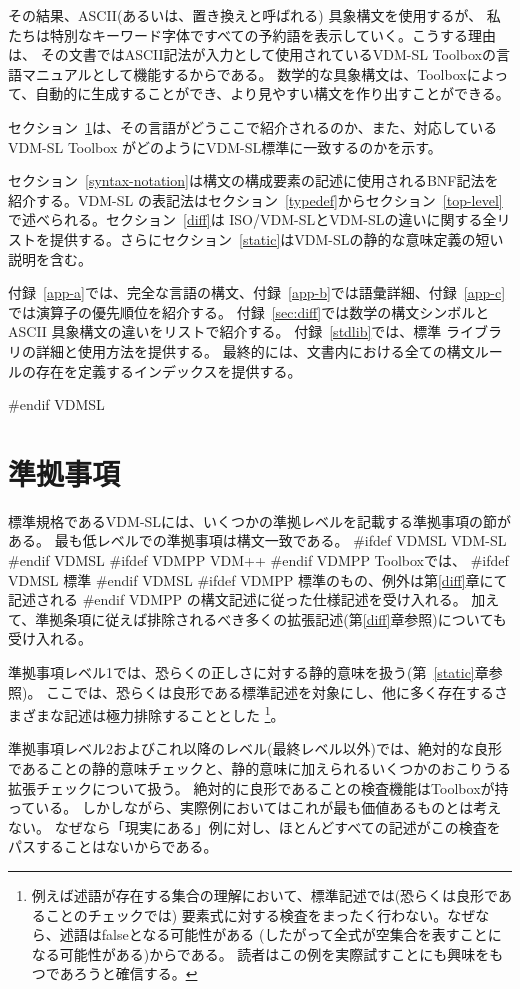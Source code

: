 \documentclass[\pformat,12pt]{jarticle}
\newcommand{\vdmslpp}[2]{%
#ifdef VDMSL
#1
#endif VDMSL
#ifdef VDMPP
#2
#endif VDMPP
}
\newcommand{\vdmsl}{VDM-SL}
\newcommand{\vdmpp}{VDM++}
\begin{document}
その結果、ASCII(あるいは、置き換えと呼ばれる) 具象構文を使用するが、
私たちは特別なキーワード字体ですべての予約語を表示していく。こうする理由は、
その文書ではASCII記法が入力として使用されているVDM-SL Toolboxの言語マニュアルとして機能するからである。
数学的な具象構文は、Toolboxによって、自動的に生成することができ、より見やすい構文を作り出すことができる。

セクション~\ref{conformance}は、その言語がどうここで紹介されるのか、また、対応しているVDM-SL Toolbox
がどのようにVDM-SL標準に一致するのかを示す。

セクション~\ref{syntax-notation}は構文の構成要素の記述に使用されるBNF記法を紹介する。VDM-SL
の表記法はセクション~\ref{typedef}からセクション~\ref{top-level}で述べられる。セクション~\ref{diff}は
ISO/VDM-SLとVDM-SLの違いに関する全リストを提供する。さらにセクション~\ref{static}はVDM-SLの静的な意味定義の短い説明を含む。

付録~\ref{app-a}では、完全な言語の構文、付録~\ref{app-b}では語彙詳細、付録~\ref{app-c}では演算子の優先順位を紹介する。
付録~\ref{sec:diff}では数学の構文シンボルとASCII 具象構文の違いをリストで紹介する。
付録~\ref{stdlib}では、標準 ライブラリの詳細と使用方法を提供する。
最終的には、文書内における全ての構文ルールの存在を定義するインデックスを提供する。

#endif VDMSL

\section{準拠事項}
\label{conformance}

標準規格であるVDM-SLには、いくつかの準拠レベルを記載する準拠事項の節がある。
最も低レベルでの準拠事項は構文一致である。
\vdmslpp{\vdmsl}{\vdmpp} Toolboxでは、\vdmslpp{標準}{標準のもの、例外は第\ref{diff}章にて記述される}の構文記述に従った仕様記述を受け入れる。
加えて、準拠条項に従えば排除されるべき多くの拡張記述(第\ref{diff}章参照)についても受け入れる。

準拠事項レベル1では、恐らくの正しさに対する静的意味を扱う(第~\ref{static}章参照)。
ここでは、恐らくは良形である標準記述を対象にし、他に多く存在するさまざまな記述は極力排除することとした
\footnote{例えば述語が存在する集合の理解において、標準記述では(恐らくは良形であることのチェックでは)
要素式に対する検査をまったく行わない。なぜなら、述語はfalseとなる可能性がある
(したがって全式が空集合を表すことになる可能性がある)からである。
読者はこの例を実際試すことにも興味をもつであろうと確信する。}。

準拠事項レベル2およびこれ以降のレベル(最終レベル以外)では、絶対的な良形であることの静的意味チェックと、静的意味に加えられるいくつかのおこりうる拡張チェックについて扱う。
絶対的に良形であることの検査機能はToolboxが持っている。
しかしながら、実際例においてはこれが最も価値あるものとは考えない。
なぜなら「現実にある」例に対し、ほとんどすべての記述がこの検査をパスすることはないからである。
\end{document}
